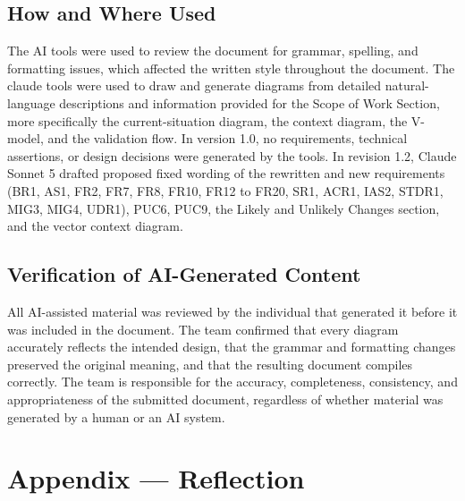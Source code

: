 \documentclass[12pt]{article}
\begin{document}
\subsection{How and Where Used}

The AI tools were used to review the document for grammar,
spelling, and formatting issues, which affected the written style throughout the
document. The claude tools were used to draw and generate diagrams from detailed
natural-language descriptions and information provided for the Scope of Work Section, more specifically the
current-situation diagram, the context diagram, the V-model, and the validation
flow. In version 1.0, no requirements, technical assertions, or design decisions were
generated by the tools. In revision 1.2, Claude Sonnet 5 drafted proposed fixed wording of
the rewritten and new requirements (BR1, AS1, FR2, FR7, FR8, FR10, FR12 to FR20,
SR1, ACR1, IAS2, STDR1, MIG3, MIG4, UDR1), PUC6, PUC9, the Likely and Unlikely
Changes section, and the vector context diagram.

\subsection{Verification of AI-Generated Content}

All AI-assisted material was reviewed by the individual that generated it before it was included in the
document. The team confirmed that every diagram accurately reflects the intended
design, that the grammar and formatting changes preserved the original meaning,
and that the resulting document compiles correctly. The team is
responsible for the accuracy, completeness, consistency, and appropriateness of
the submitted document, regardless of whether material was generated by a human
or an AI system.

\newpage{}

\section{Appendix --- Reflection}




\end{document}
